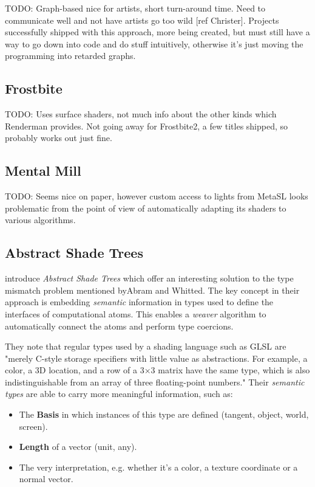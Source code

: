 TODO: Graph-based nice for artists, short turn-around time. Need to communicate well and not have artists go too wild [ref Christer]. Projects successfully shipped with this approach, more being created, but must still have a way to go down into code and do stuff intuitively, otherwise it's just moving the programming into retarded graphs.

\subsection{Frostbite}

TODO: Uses surface shaders, not much info about the other kinds which Renderman provides. Not going away for Frostbite2, a few titles shipped, so probably works out just fine.

\subsection{Mental Mill}

TODO: Seems nice on paper, however custom access to lights from MetaSL looks problematic from the point of view of automatically adapting its shaders to various algorithms.

\subsection{Abstract Shade Trees}

\citet{mcguire2006shadetrees} introduce \emph{Abstract Shade Trees} which offer an interesting solution to the type mismatch problem mentioned byAbram and Whitted. The key concept in their approach is embedding \emph{semantic} information in types used to define the interfaces of computational atoms. This enables a \emph{weaver} algorithm to automatically connect the atoms and perform type coercions.

They note that regular types used by a shading language such as GLSL are "merely C-style storage specifiers with little value as abstractions. For example, a color, a 3D location, and a row of a 3×3 matrix have the same type, which is also indistinguishable from an array of three floating-point numbers." Their \emph{semantic types} are able to carry more meaningful information, such as:
\begin{itemize}
\item The \textbf{Basis} in which instances of this type are defined (tangent, object, world, screen).
\item \textbf{Length} of a vector (unit, any).
\item The very interpretation, e.g. whether it’s a color, a texture coordinate or a normal vector.
\end{itemize}

